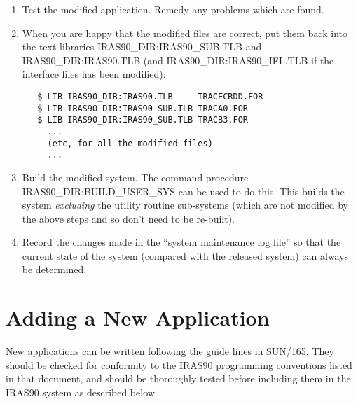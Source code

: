 \begin{enumerate}
\item Test the modified application. Remedy any problems which are found.

\item When you are happy that the modified files are correct, put them back into
the text libraries {\small IRAS90\_DIR:IRAS90\_SUB.TLB} and {\small
IRAS90\_DIR:IRAS90.TLB} (and {\small IRAS90\_DIR:IRAS90\_IFL.TLB} if the interface
files has been modified):

\small
\begin{verbatim}
   $ LIB IRAS90_DIR:IRAS90.TLB     TRACECRDD.FOR
   $ LIB IRAS90_DIR:IRAS90_SUB.TLB TRACA0.FOR
   $ LIB IRAS90_DIR:IRAS90_SUB.TLB TRACB3.FOR
     ...
     (etc, for all the modified files)
     ...
\end{verbatim}
\normalsize

\item Build the modified system. The command procedure {\small
IRAS90\_DIR:BUILD\_USER\_SYS} can be used to do this. This builds the system
{\em excluding} the utility routine sub-systems (which are not modified by the
above steps and so don't need to be re-built).

\item Record the changes made in the ``system maintenance log file'' so that the
current state of the system (compared with the released system) can
always be determined.

\end{enumerate}

\section{Adding a New Application}
New applications can be written following the guide lines in SUN/165. They
should be checked for conformity to the {\small IRAS90} programming conventions
listed in that document, and should be thoroughly tested before including them
in the {\small IRAS90} system as described below.


